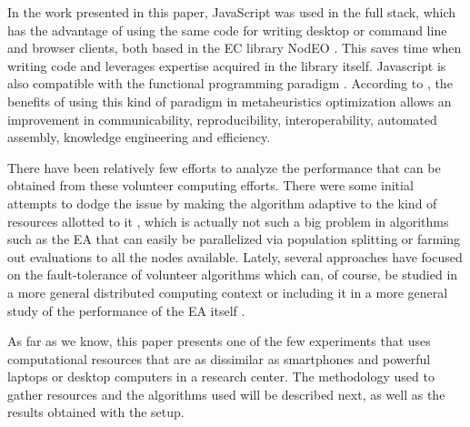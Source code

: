 \documentclass[journal,onecolumn]{IEEEtran}
\begin{document}
In the work presented in this paper, JavaScript was used in the full 
stack, which has the advantage of using the same code for writing
desktop or command line and browser clients, both based in the EC
library NodEO \cite{DBLP:conf/gecco/GuervosVGES14}. This saves time when writing code and leverages %
expertise acquired in the library itself. %
Javascript is also compatible with the functional programming paradigm \cite{Cousineau1998,MacLennan1990,Thompson1996}. 
According to \cite{swanresearch2015}, the benefits of using this kind of paradigm in 
metaheuristics optimization allows an improvement in communicability, 
reproducibility, interoperability, automated assembly, knowledge engineering 
and efficiency. 

There have been relatively few efforts to analyze the
performance that can be obtained from these volunteer computing
efforts. 
There were some initial attempts  to dodge the issue by making
the algorithm adaptive to the kind of resources allotted to it
\cite{milani2004online}, which is actually not such a big problem in
algorithms such as the EA that can easily be
parallelized via population splitting or farming out evaluations to all
the nodes available. Lately, several approaches have focused on the
fault-tolerance of volunteer algorithms
\cite{gonzalez2010characterizing} which can, of course, be studied in
a more general distributed computing context
\cite{nogueras2015studying} or including it in a more general study of the
performance of the EA itself
\cite{DBLP:journals/gpem/LaredoBGVAGF14}. 


As far as we know, this paper presents one of the few experiments that
uses computational 
resources that are as dissimilar as smartphones and powerful laptops
or desktop computers in a research center. The methodology used to
gather resources and the algorithms used will be described next, as
well as the results obtained with the setup.
\end{document}
